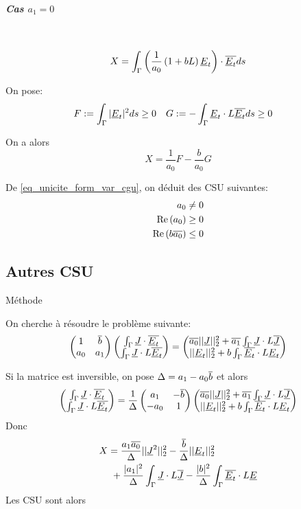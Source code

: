 \subparagraph{Cas $a_1=0$}
~
\[
X = \int_\Gamma \left( \dfrac{1}{a_0}\left(1+bL\right)\underline{E}_t\right) \cdot {\overline{\underline{E}_t}} ds
\]

On pose:
\begin{align*}
F&:= \int_\Gamma | \underline{E}_t | ^2 ds \ge 0 & G &:= -\int_\Gamma \underline{E}_t \cdot L{\overline{\underline{E}_t}} ds \ge 0
\end{align*}

On a alors
\begin{equation}
\label{eq_unicite_form_var_decomp_cgu_ci1_a1_nul}
X = \frac{1}{a_0}F - \frac{b}{a_0}G
\end{equation}

De \eqref{eq_unicite_form_var_cgu}, on déduit des CSU suivantes:
\begin{align}
a_0 \not= 0\\
\operatorname{Re}\left(a_0\right) \ge 0\\
\operatorname{Re}\left(b{\overline{a_0}}\right) \le 0
\end{align}




\subsection{Autres CSU}
Méthode \cite{stupfel_implementation_2015}

On cherche à résoudre le problème suivante:
\[
\begin{pmatrix}
1 & {\overline{b}} \\
a_0 & a_1
\end{pmatrix}
\begin{pmatrix}
\int_\Gamma \underline{J} \cdot {\overline{\underline{E}_t}} \\
\int_\Gamma \underline{J}\cdot L{\overline{\underline{E}_t}}
\end{pmatrix}
=
\begin{pmatrix}
{\overline{a_0}}||\underline{J}||_2^2 + {\overline{a_1}}\int_\Gamma \underline{J} \cdot L{\overline{\underline{J}}} \\
||\underline{E}_t||_2^2 + b\int_\Gamma {\overline{\underline{E}_t}} \cdot L\underline{E}_t
\end{pmatrix}
\]

Si la matrice est inversible, on pose $\Delta = a_1 - a_0{\overline{b}}$ et alors
\[
\begin{pmatrix}
\int_\Gamma \underline{J} \cdot {\overline{\underline{E}_t}} \\
\int_\Gamma \underline{J}\cdot L{\overline{\underline{E}_t}}
\end{pmatrix}
=\dfrac{1}{\Delta}
\begin{pmatrix}
a_1 & -{\overline{b}} \\
-a_0 & 1
\end{pmatrix}
\begin{pmatrix}
{\overline{a_0}}||\underline{J}||_2^2 + {\overline{a_1}}\int_\Gamma \underline{J} \cdot L{\overline{\underline{J}}} \\
||\underline{E}_t||_2^2 + b\int_\Gamma {\overline{\underline{E}_t}} \cdot L\underline{E}_t
\end{pmatrix}
\]
Donc
\begin{align*}
X &=  \dfrac{a_1{\overline{a_0}}}{\Delta}||\underline{J}^2||_2^2 - \dfrac{{\overline{b}}}{\Delta}||\underline{E}_t||_2^2 \\
&~+\dfrac{|a_1|^2}{\Delta}\int_\Gamma\underline{J}\cdot L {\overline{\underline{J}}} - \dfrac{|b|^2}{\Delta}\int_\Gamma{\overline{\underline{E}_t}}\cdot L\underline{E}
\end{align*}
Les CSU sont alors

